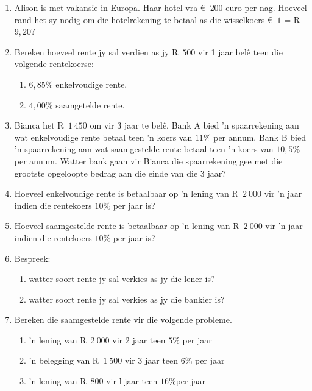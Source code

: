 \begin{eocexercises}{}
    \begin{enumerate}[label=\textbf{\arabic*}.]
	\item Alison is met vakansie in Europa. Haar hotel vra €~$200$ euro per nag. Hoeveel rand het sy nodig om die hotelrekening te betaal as die wisselkoers  €~$1$ = R~$9,20$?

	\item Bereken hoeveel rente jy sal verdien as jy R~$500$ vir 1 jaar belê teen die volgende rentekoerse:
	\begin{enumerate}
	    \item $6,85\%$ enkelvoudige rente.
	    \item $4,00\%$ saamgetelde rente.
	\end{enumerate}

	\item Bianca het R~$1~450$ om vir 3 jaar te belê. Bank A bied ’n spaarrekening aan wat enkelvoudige rente betaal
teen ’n koers van $11\%$ per annum. Bank B bied ’n spaarrekening aan wat saamgestelde rente betaal
teen ’n koers van $10,5\%$ per annum. Watter bank gaan vir Bianca die spaarrekening gee met die grootste
opgeloopte bedrag aan die einde van die 3 jaar?

	\item Hoeveel enkelvoudige rente is betaalbaar op ’n lening van R~$2~000$ vir ’n jaar indien die rentekoers $10\%$ per jaar is?

	\item Hoeveel saamgestelde rente is betaalbaar op ’n lening van  R~$2~000$ vir ’n jaar indien die rentekoers $10\%$ per jaar is?

	\item Bespreek:
	\begin{enumerate}
	    \item watter soort rente jy sal verkies as jy die lener is?

	    \item watter soort rente jy sal verkies as jy die bankier is?
	\end{enumerate}

	\item Bereken die saamgestelde rente vir die volgende probleme.
	\begin{enumerate}
	    \item ’n lening van R~$2~000$ vir 2 jaar teen  $5\%$ per jaar
	    \item ’n belegging van  R~$1~500$ vir 3 jaar teen $6\%$ per jaar
	    \item ’n lening van R~$800$ vir l jaar teen $16\%$per jaar
	\end{enumerate}


\end{enumerate}
\end{eocexercises}
